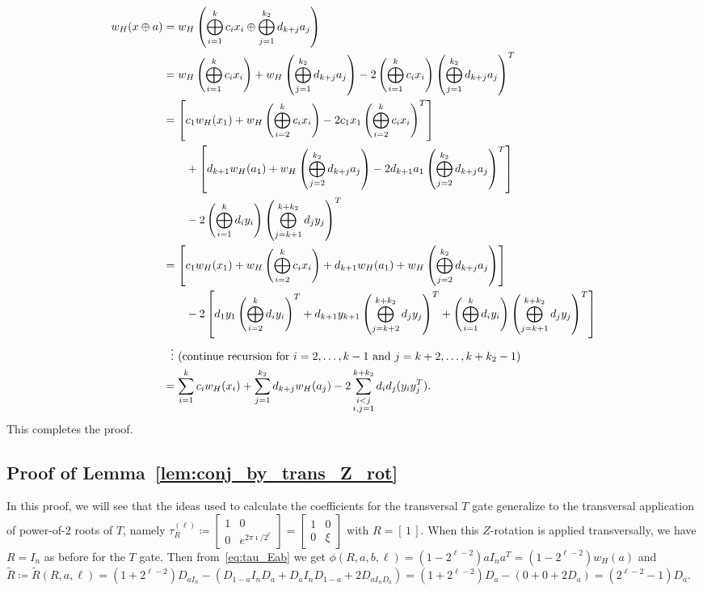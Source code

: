 \documentclass[twoside,romanappendices]{IEEEtran}
\begin{document}
\begin{align}
w_H(x \oplus a) & = w_H\left( \bigoplus_{i=1}^{k} c_i x_i \oplus \bigoplus_{j=1}^{k_2} d_{k+j} a_j \right) \\
%
  & = w_H\left( \bigoplus_{i=1}^{k} c_i x_i \right) + w_H\left( \bigoplus_{j=1}^{k_2} d_{k+j} a_j \right) - 2 \left( \bigoplus_{i=1}^{k} c_i x_i \right) \left( \bigoplus_{j=1}^{k_2} d_{k+j} a_j \right)^T \\
%
  & = \left[ c_1 w_H(x_1) + w_H\left( \bigoplus_{i=2}^{k} c_i x_i \right) - 2 c_1 x_1 \left( \bigoplus_{i=2}^{k} c_i x_i \right)^T \right] \nonumber \\
%
  & \qquad + \left[ d_{k+1} w_H(a_1) + w_H\left( \bigoplus_{j=2}^{k_2} d_{k+j} a_j \right) - 2 d_{k+1} a_1 \left( \bigoplus_{j=2}^{k_2} d_{k+j} a_j \right)^T \right] \nonumber \\
%
  & \qquad - 2 \left( \bigoplus_{i=1}^{k} d_i y_i \right) \left( \bigoplus_{j=k+1}^{k+k_2} d_j y_j \right)^T \\
%
  & = \left[ c_1 w_H(x_1) + w_H\left( \bigoplus_{i=2}^{k} c_i x_i \right) + d_{k+1} w_H(a_1) + w_H\left( \bigoplus_{j=2}^{k_2} d_{k+j} a_j \right) \right] \\
%
  & \qquad - 2 \left[ d_1 y_1 \left( \bigoplus_{i=2}^{k} d_i y_i \right)^T + d_{k+1} y_{k+1} \left( \bigoplus_{j=k+2}^{k+k_2} d_j y_j \right)^T + \left( \bigoplus_{i=1}^{k} d_i y_i \right) \left( \bigoplus_{j=k+1}^{k+k_2} d_j y_j \right)^T \right] \\
%
  & \ \ {\large \vdots} \ (\text{continue\ recursion\ for}\ i=2,\ldots,k-1\ \text{and}\ j=k+2,\ldots,k+k_2-1) \nonumber \\
%
  & = \sum_{i=1}^{k} c_i w_H(x_i) + \sum_{j = 1}^{k_2} d_{k+j} w_H(a_j) - 2 \sum_{\substack{i < j\\i,j = 1}}^{k+k_2} d_i d_j (y_i y_j^T).
\end{align}
This completes the proof.  \hfill \IEEEQEDhere


\subsection{Proof of Lemma~\ref{lem:conj_by_trans_Z_rot}}
\label{sec:proof_conj_by_trans_Z_rot}


In this proof, we will see that the ideas used to calculate the coefficients for the transversal $T$ gate generalize to the transversal application of power-of-$2$ roots of $T$, namely $\tau_{R}^{(\ell)} \coloneqq 
\begin{bmatrix}
1 & 0 \\
0 & e^{2\pi\imath/2^\ell}
\end{bmatrix} = 
\begin{bmatrix}
1 & 0 \\
0 & \xi
\end{bmatrix}
$ with $R = [\, 1\, ]$.
When this $Z$-rotation is applied transversally, we have $R = I_n$ as before for the $T$ gate.
Then from~\eqref{eq:tau_Eab} we get $\phi(R,a,b,\ell) = (1 - 2^{\ell-2}) a I_n a^T = (1 - 2^{\ell-2}) w_H(a)$ and $\tilde{R} \coloneqq \tilde{R}(R,a,\ell) = (1 + 2^{\ell-2}) D_{a I_n} - (D_{1-a} I_n D_a + D_a I_n D_{1-a} + 2 D_{a I_n D_a}) = (1 + 2^{\ell-2}) D_a - (0 + 0 + 2 D_a) = (2^{\ell-2} - 1) D_a$.
\end{document}

